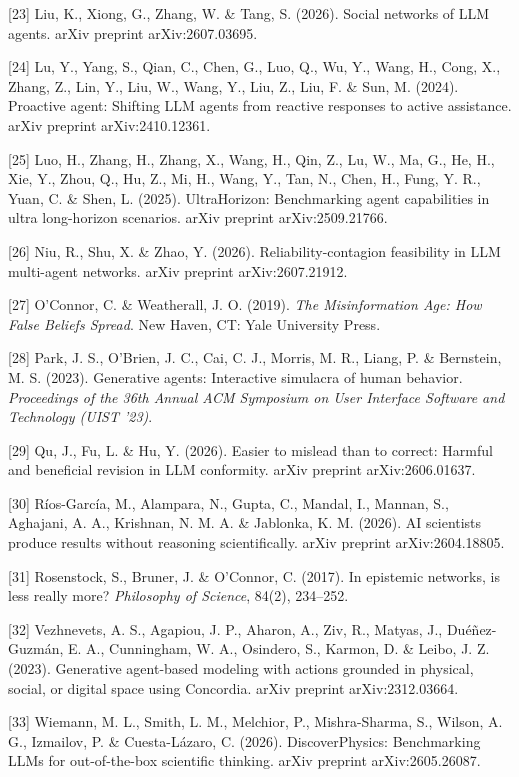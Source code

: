 \documentclass[pdflatex,sn-basic]{sn-jnl}
\begin{document}
{[}23{]} Liu, K., Xiong, G., Zhang, W. \& Tang, S. (2026). Social networks of LLM agents. arXiv preprint arXiv:2607.03695.

{[}24{]} Lu, Y., Yang, S., Qian, C., Chen, G., Luo, Q., Wu, Y., Wang, H., Cong, X., Zhang, Z., Lin, Y., Liu, W., Wang, Y., Liu, Z., Liu, F. \& Sun, M. (2024). Proactive agent: Shifting LLM agents from reactive responses to active assistance. arXiv preprint arXiv:2410.12361.

{[}25{]} Luo, H., Zhang, H., Zhang, X., Wang, H., Qin, Z., Lu, W., Ma, G., He, H., Xie, Y., Zhou, Q., Hu, Z., Mi, H., Wang, Y., Tan, N., Chen, H., Fung, Y. R., Yuan, C. \& Shen, L. (2025). UltraHorizon: Benchmarking agent capabilities in ultra long-horizon scenarios. arXiv preprint arXiv:2509.21766.

{[}26{]} Niu, R., Shu, X. \& Zhao, Y. (2026). Reliability-contagion feasibility in LLM multi-agent networks. arXiv preprint arXiv:2607.21912.

{[}27{]} O'Connor, C. \& Weatherall, J. O. (2019). \emph{The Misinformation Age: How False Beliefs Spread}. New Haven, CT: Yale University Press.

{[}28{]} Park, J. S., O'Brien, J. C., Cai, C. J., Morris, M. R., Liang, P. \& Bernstein, M. S. (2023). Generative agents: Interactive simulacra of human behavior. \emph{Proceedings of the 36th Annual ACM Symposium on User Interface Software and Technology (UIST '23)}.

{[}29{]} Qu, J., Fu, L. \& Hu, Y. (2026). Easier to mislead than to correct: Harmful and beneficial revision in LLM conformity. arXiv preprint arXiv:2606.01637.

{[}30{]} Ríos-García, M., Alampara, N., Gupta, C., Mandal, I., Mannan, S., Aghajani, A. A., Krishnan, N. M. A. \& Jablonka, K. M. (2026). AI scientists produce results without reasoning scientifically. arXiv preprint arXiv:2604.18805.

{[}31{]} Rosenstock, S., Bruner, J. \& O'Connor, C. (2017). In epistemic networks, is less really more? \emph{Philosophy of Science}, 84(2), 234--252.

{[}32{]} Vezhnevets, A. S., Agapiou, J. P., Aharon, A., Ziv, R., Matyas, J., Duéñez-Guzmán, E. A., Cunningham, W. A., Osindero, S., Karmon, D. \& Leibo, J. Z. (2023). Generative agent-based modeling with actions grounded in physical, social, or digital space using Concordia. arXiv preprint arXiv:2312.03664.

{[}33{]} Wiemann, M. L., Smith, L. M., Melchior, P., Mishra-Sharma, S., Wilson, A. G., Izmailov, P. \& Cuesta-Lázaro, C. (2026). DiscoverPhysics: Benchmarking LLMs for out-of-the-box scientific thinking. arXiv preprint arXiv:2605.26087.
\end{document}
